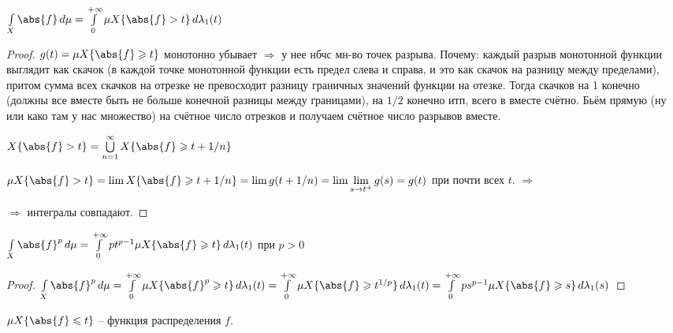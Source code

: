 \begin{consequence}
	$\int\limits_X \abs{f}\,d\mu = \int\limits_0^{+\infty}\mu X\{\abs{f} > t\}\,d\lambda_1(t)$
\end{consequence}

\begin{proof}\thmslashn
	
    $g(t) = \mu X\{\abs{f} \geqslant t\}$ монотонно убывает $\Rightarrow$ у нее нбчс мн-во точек разрыва. Почему: каждый разрыв монотонной функции выглядит как скачок (в каждой точке монотонной функции есть предел слева и справа, и это как скачок на разницу между пределами), притом сумма всех скачков на отрезке не превосходит разницу граничных значений функции на отезке. Тогда скачков на 1 конечно (должны все вместе быть не больше конечной разницы между границами), на $1/2$ конечно итп, всего в вместе счётно. Бьём прямую (ну или како там у нас множество) на счётное число отрезков и получаем счётное число разрывов вместе.
	
	$X\{\abs{f} > t\} = \bigcup\limits_{n=1}^{\infty} X\{\abs{f} \geqslant t + 1/n\}$
	
    $\mu X\{\abs{f} > t\} = \lim X\{\abs{f} \geqslant t + 1/n\} = \lim g(t + 1/n) = \lim\lim\limits_{s\to t^+} g(s) = g(t)$ при почти всех $t$. $\Rightarrow$ 
	
	$\Rightarrow$ интегралы совпадают.
	
\end{proof}


\begin{consequence}
	$\int\limits_X \abs{f}^p\,d\mu = \int\limits_0^{+\infty}pt^{p-1}\mu X\{\abs{f} \geqslant t\}\,d\lambda_1(t)$ при $p>0$
\end{consequence}

\begin{proof}\thmslashn
	
	$\int\limits_X \abs{f}^p\,d\mu = \int\limits_0^{+\infty}\mu X\{\abs{f}^p \geqslant t\}\,d\lambda_1(t) = \int\limits_0^{+\infty}\mu X\{\abs{f} \geqslant t^{1/p}\}\,d\lambda_1(t) = \int\limits_0^{+\infty}ps^{p-1} \mu X\{\abs{f} \geqslant s\}\,d\lambda_1(s)$
	
\end{proof}

\begin{remark}
	$\mu X\{\abs{f} \leqslant t\}$ -- функция распределения $f$.
\end{remark}